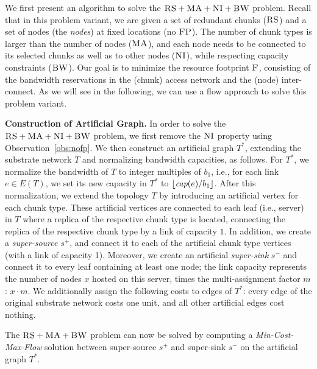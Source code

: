 \documentclass[9pt]{sigcomm-alternate}
\newcommand{\MaFactor}{m}
\newcommand{\Source}{\ensuremath{s^{+}}}
\newcommand{\Sink}{\ensuremath{s^{-}}}
\newcommand{\capacity}{\emph{cap}}
\newcommand{\CC}{\textsc{NI}}
\newcommand{\FP}{\textsc{FP}}
\newcommand{\RS}{\textsc{RS}}
\newcommand{\BW}{\textsc{BW}}
\newcommand{\MA}{\textsc{MA}}
\newcommand{\Cost}{\textsc{F}}
\newcommand{\Tree}{\ensuremath{T}}
\newcommand{\CostTrans}{\ensuremath{b_1}}
\begin{document}
We first present an algorithm to solve the $\RS+\MA+\CC+\BW$ problem.
Recall that in this problem variant,
we are given a set of redundant chunks ($\RS$) and a set of nodes
(the \emph{nodes})
at fixed locations (no $\FP$). The number of chunk types is larger than the number
of nodes ($\MA$), and each node needs to be connected
to its selected chunks as well as to other nodes ($\CC$), while respecting
capacity constraints ($\BW$).
Our goal is to minimize the resource footprint $\Cost$, consisting
of the bandwidth reservations in the (chunk) access network and the (node)
inter-connect.
As we will see in the following, we can use a flow approach to solve this
problem variant.




\textbf{Construction of Artificial Graph.}
In order to solve the $\RS+\MA+\CC+\BW$ problem,
we first remove the $\CC$ property using Observation~\ref{obs:nofp}.
We then construct
an artificial graph $\Tree^*$, extending the substrate network $\Tree$ and
normalizing bandwidth capacities, as follows. For $\Tree^*$,
we normalize the bandwidth of $\Tree$ to integer multiples of $\CostTrans$,
i.e., for each link $e\in E(\Tree)$, we set its new
capacity in $\Tree^*$ to $\lfloor\capacity(e)/\CostTrans\rfloor$.
After this normalization, we extend the topology $\Tree$ by
introducing an artificial vertex for each chunk type. These artificial
vertices are connected to each leaf (i.e., server) in $\Tree$ where a replica
 of the respective chunk type is located,
connecting the replica of the respective chunk type by a link of capacity $1$. In
addition, we create a
\emph{super-source} $\Source$, and connect it to each of the artificial chunk
type vertices (with a link of capacity 1). Moreover, we create an artificial \emph{super-sink} $\Sink$ and
connect it to every leaf containing at least one node; the link capacity represents
the number of nodes $x$ hosted on this server, times the multi-assignment factor
$\MaFactor$:
$x \cdot \MaFactor$.
We additionally assign the following costs to edges of $\Tree^*$:
every edge of the original substrate network costs one unit, and all other artificial edges
cost nothing.

The $\RS+\MA+\BW$ problem can now be solved by computing
a \emph{Min-Cost-Max-Flow} solution between super-source $\Source$ and
super-sink $\Sink$ on the artificial graph $\Tree^*$.
\end{document}
